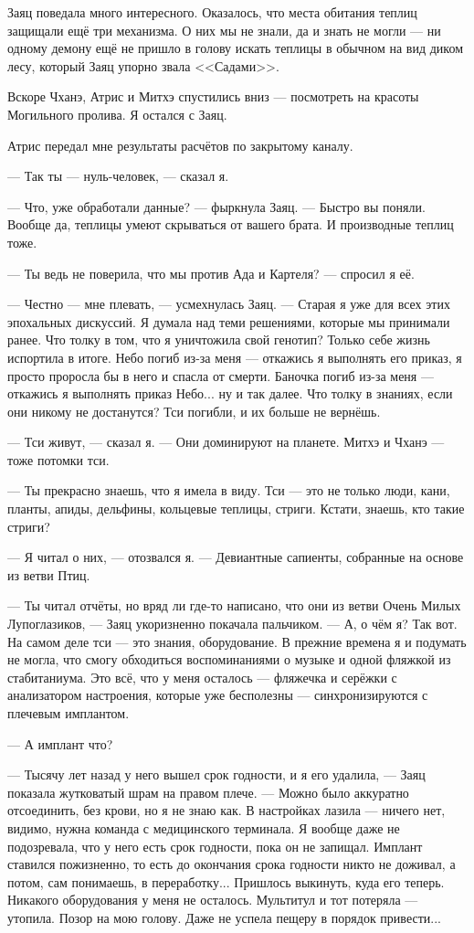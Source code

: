 Заяц поведала много интересного.
Оказалось, что места обитания теплиц защищали ещё три механизма.
О них мы не знали, да и знать не могли --- ни одному демону ещё не пришло в голову искать теплицы в обычном на вид диком лесу, который Заяц упорно звала <<Садами>>.

Вскоре Чханэ, Атрис и Митхэ спустились вниз --- посмотреть на красоты Могильного пролива.
Я остался с Заяц.

Атрис передал мне результаты расчётов по закрытому каналу.

--- Так ты --- нуль-человек, --- сказал я.

--- Что, уже обработали данные? --- фыркнула Заяц.
--- Быстро вы поняли.
Вообще да, теплицы умеют скрываться от вашего брата.
И производные теплиц тоже.

--- Ты ведь не поверила, что мы против Ада и Картеля? --- спросил я её.

--- Честно --- мне плевать, --- усмехнулась Заяц.
--- Старая я уже для всех этих эпохальных дискуссий.
Я думала над теми решениями, которые мы принимали ранее.
Что толку в том, что я уничтожила свой генотип?
Только себе жизнь испортила в итоге.
Небо погиб из-за меня --- откажись я выполнять его приказ, я просто проросла бы в него и спасла от смерти.
Баночка погиб из-за меня --- откажись я выполнять приказ Небо... ну и так далее.
Что толку в знаниях, если они никому не достанутся?
Тси погибли, и их больше не вернёшь.

--- Тси живут, --- сказал я.
--- Они доминируют на планете.
Митхэ и Чханэ --- тоже потомки тси.

--- Ты прекрасно знаешь, что я имела в виду.
Тси --- это не только люди, кани, планты, апиды, дельфины, кольцевые теплицы, стриги.
Кстати, знаешь, кто такие стриги?

--- Я читал о них, --- отозвался я.
--- Девиантные сапиенты, собранные на основе из ветви Птиц.

--- Ты читал отчёты, но вряд ли где-то написано, что они из ветви Очень Милых Лупоглазиков, --- Заяц укоризненно покачала пальчиком.
--- А, о чём я?
Так вот.
На самом деле тси --- это знания, оборудование.
В прежние времена я и подумать не могла, что смогу обходиться воспоминаниями о музыке и одной фляжкой из стабитаниума.
Это всё, что у меня осталось --- фляжечка и серёжки с анализатором настроения, которые уже бесполезны --- синхронизируются с плечевым имплантом.

--- А имплант что?

--- Тысячу лет назад у него вышел срок годности, и я его удалила, --- Заяц показала жутковатый шрам на правом плече.
--- Можно было аккуратно отсоединить, без крови, но я не знаю как.
В настройках лазила --- ничего нет, видимо, нужна команда с медицинского терминала.
Я вообще даже не подозревала, что у него есть срок годности, пока он не запищал.
Имплант ставился пожизненно, то есть до окончания срока годности никто не доживал, а потом, сам понимаешь, в переработку...
Пришлось выкинуть, куда его теперь.
Никакого оборудования у меня не осталось.
Мультитул и тот потеряла --- утопила.
Позор на мою голову.
Даже не успела пещеру в порядок привести...

